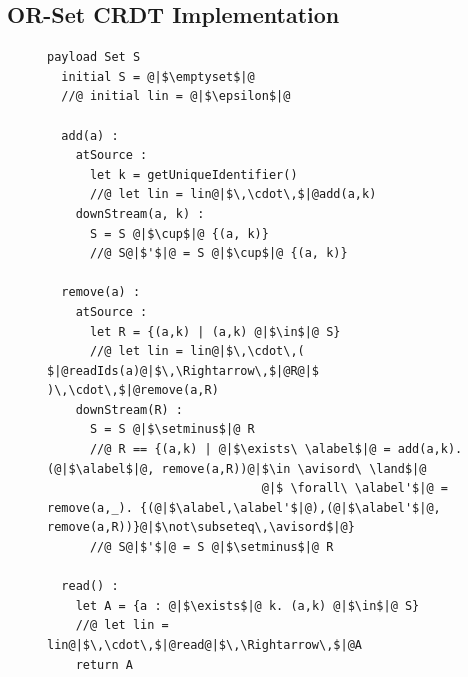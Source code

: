 

\subsection{OR-Set CRDT Implementation}
\label{sec:or-set-crdt}

\begin{figure}[!t]
  \centering
\begin{lstlisting}[caption={Pseudo-code of the OR-Set CRDT},
captionpos=b,label={lst:or-set}]
  payload Set S
  initial S = @|$\emptyset$|@
  //@ initial lin = @|$\epsilon$|@

  add(a) :
    atSource :
      let k = getUniqueIdentifier()
      //@ let lin = lin@|$\,\cdot\,$|@add(a,k)
    downStream(a, k) :
      S = S @|$\cup$|@ {(a, k)}
      //@ S@|$'$|@ = S @|$\cup$|@ {(a, k)}

  remove(a) :
    atSource :
      let R = {(a,k) | (a,k) @|$\in$|@ S}
      //@ let lin = lin@|$\,\cdot\,( $|@readIds(a)@|$\,\Rightarrow\,$|@R@|$ )\,\cdot\,$|@remove(a,R)
    downStream(R) :
      S = S @|$\setminus$|@ R
      //@ R == {(a,k) | @|$\exists\ \alabel$|@ = add(a,k). (@|$\alabel$|@, remove(a,R))@|$\in \avisord\ \land$|@
                              @|$ \forall\ \alabel'$|@ = remove(a,_). {(@|$\alabel,\alabel'$|@),(@|$\alabel'$|@, remove(a,R))}@|$\not\subseteq\,\avisord$|@}
      //@ S@|$'$|@ = S @|$\setminus$|@ R

  read() :
    let A = {a : @|$\exists$|@ k. (a,k) @|$\in$|@ S}
    //@ let lin = lin@|$\,\cdot\,$|@read@|$\,\Rightarrow\,$|@A
    return A
\end{lstlisting}
\end{figure}

